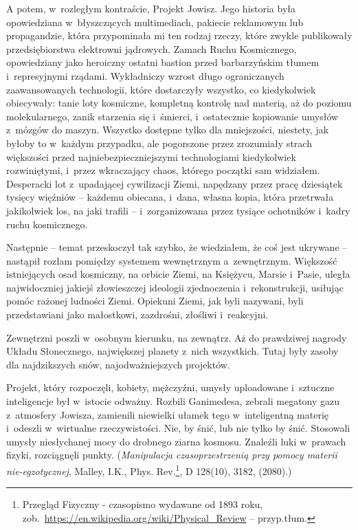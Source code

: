 \documentclass[oneside,polish,11pt,sfheadings]{mwbk}
\begin{document}
A potem, w~rozległym kontraście, Projekt Jowisz. Jego historia była
opowiedziana w~błyszczących multimediach, pakiecie reklamowym lub
propagandzie, która przypominała mi ten rodzaj rzeczy, które zwykle
publikowały przedsiębiorstwa elektrowni jądrowych. Zamach Ruchu
Kosmicznego, opowiedziany jako heroiczny ostatni bastion przed
barbarzyńskim tłumem i~represyjnymi rządami. Wykładniczy wzrost długo
ograniczanych zaawansowanych technologii, które dostarczyły wszystko, co
kiedykolwiek obiecywały: tanie loty kosmiczne, kompletną kontrolę nad
materią, aż do poziomu molekularnego, zanik starzenia się i~śmierci, i~ostatecznie kopiowanie umysłów z~mózgów do maszyn. Wszystko dostępne
tylko dla mniejszości, niestety, jak byłoby to w~każdym przypadku, ale
pogorszone przez zrozumiały strach większości przed
najniebezpieczniejszymi technologiami kiedykolwiek rozwiniętymi, i~przez
wkraczający chaos, którego początki sam widziałem. Desperacki lot z~upadającej cywilizacji Ziemi, napędzany przez pracę dziesiątek tysięcy
więźniów -- każdemu obiecana, i~dana, własna kopia, która przetrwała
jakikolwiek los, na jaki trafili -- i~zorganizowana przez tysiące
ochotników i~kadry ruchu kosmicznego.

Następnie -- temat przeskoczył tak szybko, że wiedziałem, że coś jest
ukrywane -- nastąpił rozłam pomiędzy systemem wewnętrznym a~zewnętrznym.
Większość istniejących osad kosmiczny, na orbicie Ziemi, na Księżycu,
Marsie i~Pasie, uległa najwidoczniej jakiejś złowieszczej ideologii
zjednoczenia i~rekonstrukcji, usiłując pomóc rażonej ludności Ziemi.
Opiekuni Ziemi, jak byli nazywani, byli przedstawiani jako małostkowi,
zazdrośni, złośliwi i~reakcyjni.

Zewnętrzni poszli w~osobnym kierunku, na zewnątrz. Aż do prawdziwej
nagrody Układu Słonecznego, największej planety z~nich wszystkich. Tutaj
były zasoby dla najdzikszych snów, najodważniejszych projektów.

Projekt, który rozpoczęli, kobiety, mężczyźni, umysły uploadowane i~sztuczne inteligencje był w~istocie odważny. Rozbili Ganimedesa, zebrali
megatony gazu z~atmosfery Jowisza, zamienili niewielki ułamek tego w~inteligentną materię i~odeszli w~wirtualne rzeczywistości. Nie, by śnić,
lub nie tylko by śnić. Stosowali umysły niesłychanej mocy do drobnego
ziarna kosmosu. Znaleźli luki w~prawach fizyki, rozciągnęli punkty. (\emph{Manipulacja czasoprzestrzenią przy pomocy materii
nie-egzotycznej}, Malley, I.K., Phys. Rev.\footnote{Przegląd Fizyczny - czasopismo wydawane od 1893 roku, zob.~\url{https://en.wikipedia.org/wiki/Physical_Review} -- przyp.tłum.}, D 128(10), 3182, (2080).)
\end{document}
